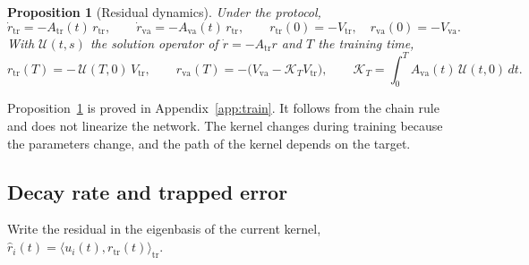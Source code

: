 \documentclass[11pt]{article}
\newtheorem{proposition}{Proposition}
\theoremstyle{definition}
\theoremstyle{remark}
\newcommand{\tr}{\mathrm{tr}}
\newcommand{\va}{\mathrm{va}}
\newcommand{\Kmap}{\mathcal{K}}
\newcommand{\Prop}{\mathcal{U}}
\begin{document}
\begin{proposition}[Residual dynamics]\label{prop:train}
Under the protocol,
\begin{equation}\label{eq:residual-dynamics}
\dot r_\tr = -A_\tr(t)\,r_\tr, \qquad \dot r_\va = -A_\va(t)\,r_\tr, \qquad r_\tr(0) = -V_\tr, \quad r_\va(0) = -V_\va .
\end{equation}
With $\Prop(t,s)$ the solution operator of $\dot r = -A_\tr r$ and $T$ the training time,
\begin{equation}\label{eq:train-residual}
r_\tr(T) = -\,\Prop(T,0)\,V_\tr, \qquad r_\va(T) = -\big(V_\va - \Kmap_T V_\tr\big), \qquad \Kmap_T = \int_0^T A_\va(t)\,\Prop(t,0)\,dt .
\end{equation}
\end{proposition}

Proposition~\ref{prop:train} is proved in Appendix~\ref{app:train}.
It follows from the chain rule and does not linearize the network.
The kernel changes during training because the parameters change, and the path of the kernel depends on the target.

\subsection{Decay rate and trapped error}

Write the residual in the eigenbasis of the current kernel, $\hat r_i(t) = \langle u_i(t), r_\tr(t)\rangle_\tr$.
\end{document}
